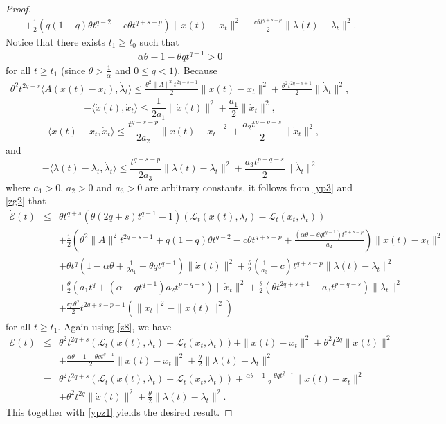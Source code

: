 \documentclass[review]{elsarticle}
\begin{document}
\begin{proof}
\begin{eqnarray}
			&&+\frac{1}{2}\left(q(1-q)\theta t^{q-2}-c\theta t^{q+s-p}\right)\|x(t)-x_t\|^2-\frac{c\theta t^{q+s-p}}{2}\|\lambda(t)-\lambda_t\|^2.
		\end{eqnarray}
Notice that there exists $t_1\ge t_0$ such that
\begin{eqnarray}\label{zg2}
		\alpha\theta-1-\theta q t^{q-1}>0
		\end{eqnarray}
for all $t\ge t_1$ (since  $\theta>\frac{1}{\alpha}$ and $0\leq q<1$).
Because
		\begin{eqnarray*}
			\theta^2 t^{2q+s}\langle A(x(t)-x_t), \dot{\lambda}_t\rangle\leq\frac{\theta^2\|A\|^2t^{2q+s-1}}{2}\|x(t)-x_t\|^2+\frac{\theta^2 t^{2q+s+1}}{2}\|\dot{\lambda}_t\|^2,
		\end{eqnarray*}		
		$$-\langle \dot{x}(t), \dot{x}_t\rangle\leq\frac{1}{2a_1}\|\dot{x}(t)\|^2+\frac{a_1}{2}\|\dot{x}_t\|^2,$$
		$$-\langle x(t)-x_t, \dot{x}_t\rangle\leq\frac{t^{q+s-p}}{2a_2}\|x(t)-x_t\|^2+\frac{a_2t^{p-q-s}}{2}\|\dot{x}_t\|^2,$$
and
$$-\langle \lambda(t)-\lambda_t, \dot{\lambda}_t \rangle\leq\frac{t^{q+s-p}}{2a_3}\|\lambda(t)-\lambda_t\|^2+\frac{a_3t^{p-q-s}}{2}\|\dot{\lambda}_t\|^2$$ where  $a_1>0$, $a_2>0$ and $a_3>0$ are arbitrary constants, it follows from \eqref{yp3} and \eqref{zg2}  that
		\begin{eqnarray}\label{ypz1}
			\dot{\mathcal{E}}(t)&\leq&\theta t^{q+s}\left(\theta(2q+s)t^{q-1}-1\right) \left(\mathcal{L}_{t}(x(t),\lambda_t)-\mathcal{L}_{t}(x_t,\lambda_t)\right)\nonumber\\
			&&+\frac{1}{2}\left(\theta^2\|A\|^2t^{2q+s-1}+q(1-q)\theta t^{q-2}-c\theta t^{q+s-p}+\frac{(\alpha\theta-\theta qt^{q-1})t^{q+s-p}}{a_2}\right)\|x(t)-x_t\|^2\nonumber\\
			&&+\theta t^q\left(1-\alpha\theta+\frac{1}{2a_1}+\theta qt^{q-1}\right)\|\dot{x}(t)\|^2+\frac{\theta}{2}\left(\frac{1}{a_3}-c\right)t^{q+s-p}\|\lambda(t)-\lambda_t\|^2\nonumber\\
			&&+\frac{\theta}{2}\left(a_1 t^q+(\alpha-qt^{q-1})a_2t^{p-q-s}\right)\|\dot{x}_t\|^2+\frac{\theta}{2}\left(\theta t^{2q+s+1}+a_3t^{p-q-s}\right)\|\dot{\lambda}_t\|^2\nonumber\\
			&&+\frac{cp\theta^2}{2}t^{2q+s-p-1}\left(\|x_t\|^2-\|x(t)\|^2\right) 
		\end{eqnarray}
for all $t\ge t_1$. Again using \eqref{z8}, we have
		\begin{eqnarray*}
			\mathcal{E}(t)&\leq&\theta^2 t^{2q+s}\left(\mathcal{L}_{t}(x(t),\lambda_t)-\mathcal{L}_{t}(x_t,\lambda_t)\right)+\|x(t)-x_t\|^2+\theta^2t^{2q}\|\dot{x}(t)\|^2\nonumber\\
			&&+\frac{\alpha\theta-1-\theta q t^{q-1}}{2}\|x(t)-x_t\|^2+\frac{\theta}{2}\|\lambda(t)-\lambda_t\|^2\\
			&=&\theta^2 t^{2q+s}\left(\mathcal{L}_{t}(x(t),\lambda_t)-\mathcal{L}_{t}(x_t,\lambda_t)\right)+\frac{\alpha\theta+1-\theta q t^{q-1}}{2}\|x(t)-x_t\|^2\nonumber\\
			&&+\theta^2t^{2q}\|\dot{x}(t)\|^2+\frac{\theta}{2}\|\lambda(t)-\lambda_t\|^2.
		\end{eqnarray*}
This together with \eqref{ypz1} yields the desired result.
	\end{proof}
\end{document}
